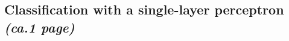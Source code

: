 \documentclass[a4paper]{article}
\begin{document}

\subsection{Classification with a single-layer perceptron \textit{(ca.1 page)}}
\end{document}
